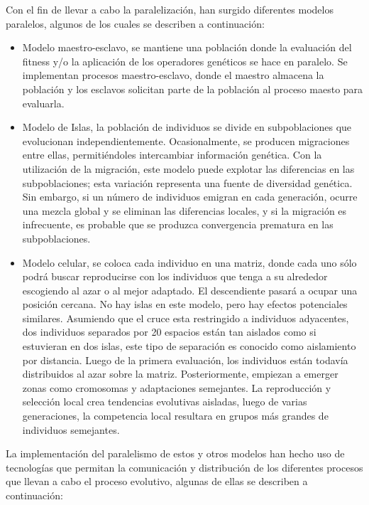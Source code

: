 Con el fin de llevar a cabo la paralelizaci\'on, han surgido diferentes modelos paralelos, algunos de los cuales se describen a continuación:

\begin{itemize}
	\item Modelo maestro-esclavo, se mantiene una población donde la evaluación del fitness y/o la aplicación de los operadores genéticos se hace en paralelo. Se implementan procesos maestro-esclavo, donde el maestro almacena la población y los esclavos solicitan parte de la población al proceso maesto para evaluarla.
	\item Modelo de Islas, la población de individuos se divide en subpoblaciones que evolucionan independientemente. Ocasionalmente, se producen migraciones entre ellas, permitiéndoles intercambiar información genética. Con la utilización de la migración, este modelo puede explotar las diferencias en las subpoblaciones; esta variación representa una fuente de diversidad genética. Sin embargo, si un número de individuos emigran en cada generación, ocurre una mezcla global y se eliminan las diferencias locales, y si la migración es infrecuente, es probable que se produzca convergencia prematura en las subpoblaciones.
	\item Modelo celular, se coloca cada individuo en una matriz, donde cada uno sólo podrá buscar reproducirse con los individuos que tenga a su alrededor escogiendo al azar o al mejor adaptado. El descendiente pasar\'a a ocupar una posición cercana. No hay islas en este modelo, pero hay efectos potenciales similares. Asumiendo que el cruce esta restringido a individuos adyacentes, dos individuos separados por 20 espacios están tan aislados como si estuvieran en dos islas, este tipo de separación es conocido como aislamiento por distancia. Luego de la primera evaluación, los individuos están todavía distribuidos al azar sobre la matriz. Posteriormente, empiezan a emerger zonas como cromosomas y adaptaciones semejantes. La reproducción y selección local crea tendencias evolutivas aisladas, luego de varias generaciones, la competencia local resultara en grupos m\'as grandes de individuos semejantes.
\end{itemize}

La implementación del paralelismo de estos y otros modelos han hecho uso de tecnologías que permitan la comunicación y distribución de los diferentes procesos que llevan a cabo el proceso evolutivo, algunas de ellas se describen a continuación:

